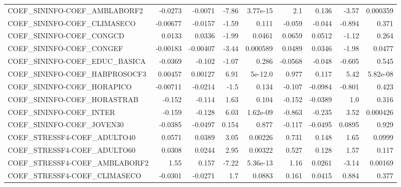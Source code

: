 \begin{tabular}{lrrrrrrrr}
COEF\_SININFO-COEF\_AMBLABORF2           &     -0.0273 &      -0.0071 &    -7.86 & 3.77e-15 &        2.1 &       0.136 &        -3.57 &      0.000359 \\
COEF\_SININFO-COEF\_CLIMASECO            &    -0.00677 &      -0.0157 &    -1.59 &    0.111 &     -0.059 &      -0.044 &       -0.894 &         0.371 \\
COEF\_SININFO-COEF\_CONGCD               &      0.0133 &       0.0336 &    -1.99 &   0.0461 &     0.0659 &      0.0512 &        -1.12 &         0.264 \\
COEF\_SININFO-COEF\_CONGEF               &    -0.00183 &     -0.00407 &    -3.44 & 0.000589 &     0.0489 &      0.0346 &        -1.98 &        0.0477 \\
COEF\_SININFO-COEF\_EDUC\_BASICA          &     -0.0369 &       -0.102 &    -1.07 &    0.286 &    -0.0568 &      -0.048 &       -0.605 &         0.545 \\
COEF\_SININFO-COEF\_HABPROSOCF3          &     0.00457 &      0.00127 &     6.91 &  5e-12.0 &      0.977 &       0.117 &         5.42 &      5.82e-08 \\
COEF\_SININFO-COEF\_HORAPICO             &    -0.00711 &      -0.0214 &     -1.5 &    0.134 &     -0.107 &     -0.0984 &       -0.801 &         0.423 \\
COEF\_SININFO-COEF\_HORASTRAB            &      -0.152 &       -0.114 &     1.63 &    0.104 &     -0.152 &     -0.0389 &          1.0 &         0.316 \\
COEF\_SININFO-COEF\_INTER                &      -0.159 &       -0.128 &     6.03 & 1.62e-09 &     -0.863 &      -0.235 &         3.52 &      0.000426 \\
COEF\_SININFO-COEF\_JOVEN30              &     -0.0385 &      -0.0497 &    0.154 &    0.877 &     -0.117 &     -0.0495 &       0.0895 &         0.929 \\
COEF\_STRESSF4-COEF\_ADULTO40            &      0.0571 &       0.0389 &     3.05 &  0.00226 &      0.731 &       0.148 &         1.65 &        0.0999 \\
COEF\_STRESSF4-COEF\_ADULTO60            &      0.0308 &       0.0244 &     2.95 &  0.00322 &      0.527 &       0.128 &         1.57 &         0.117 \\
COEF\_STRESSF4-COEF\_AMBLABORF2          &        1.55 &        0.157 &    -7.22 & 5.36e-13 &       1.16 &      0.0261 &        -3.14 &       0.00169 \\
COEF\_STRESSF4-COEF\_CLIMASECO           &     -0.0301 &      -0.0271 &      1.7 &   0.0883 &      0.161 &      0.0415 &        0.884 &         0.377 \\

\end{tabular}
